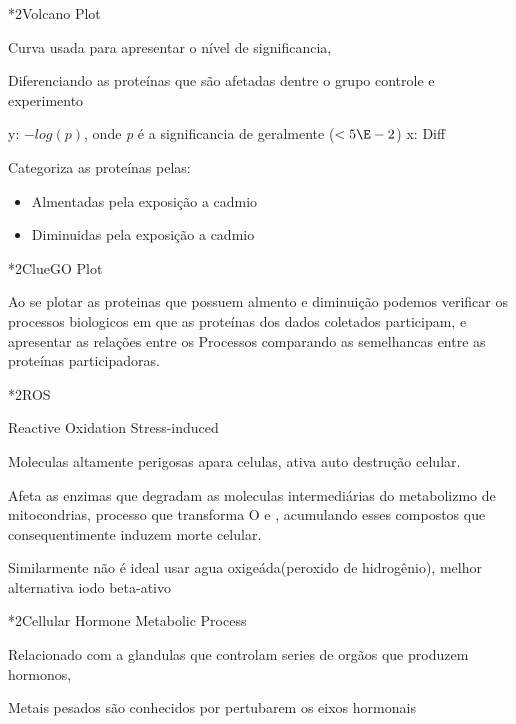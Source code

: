 \documentclass[\mainfilename]{subfiles}
\begin{document}
\begin{sectionBox}*2{Volcano Plot}
    
    Curva usada para apresentar o nível de significancia,

    Diferenciando as proteínas que são afetadas dentre o grupo controle e experimento

    y: \(-log(p)\), onde \textit{p} é a significancia de geralmente (\(<5\E-2\))
    x: Diff

    Categoriza as proteínas pelas:
    \begin{itemize}
        \item Almentadas pela exposição a cadmio
        \item Diminuidas pela exposição a cadmio
    \end{itemize}
    
\end{sectionBox}

\begin{sectionBox}*2{ClueGO Plot}
    
    Ao se plotar as proteinas que possuem almento e diminuição podemos verificar os processos biologicos em que as proteínas dos dados coletados participam, e apresentar as relações entre os Processos comparando as semelhancas entre as proteínas participadoras.

    
\end{sectionBox}

\begin{sectionBox}*2{ROS}
    
    Reactive Oxidation Stress-induced

    Moleculas altamente perigosas apara celulas, ativa auto destrução celular.

    Afeta as enzimas que degradam as moleculas intermediárias do metabolizmo de mitocondrias, processo que transforma O e , acumulando esses compostos que consequentimente induzem morte celular.

    Similarmente não é ideal usar agua oxigeáda(peroxido de hidrogênio), melhor alternativa iodo beta-ativo
    
\end{sectionBox}

\begin{sectionBox}*2{Cellular Hormone Metabolic Process}
    
    Relacionado com a glandulas que controlam series de orgãos que produzem hormonos,

    Metais pesados são conhecidos por pertubarem os eixos hormonais
    
\end{sectionBox}
\end{document}
